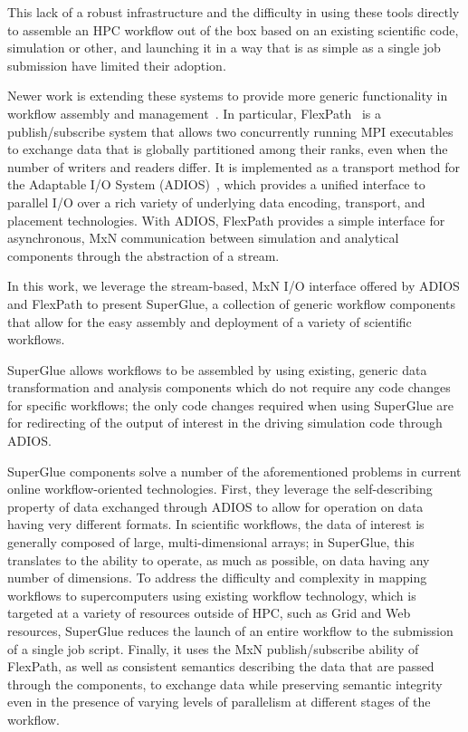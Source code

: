 
This lack of a robust infrastructure and the difficulty in
using these tools directly to assemble an
HPC workflow out of the box
based on an existing scientific code,
simulation or other,
and launching it in a way that is
as simple as a single job submission
have limited their adoption.

Newer work is extending these
systems to provide more generic functionality
in workflow assembly and
management~\cite{dayal:2014:flexpath,dayal:2015:escience,lofstead:2012:txn,lofstead:2013:txn-pdsw,lofstead:2012:txn-metadata,lofstead:2014:txn,lofstead:2016:superglue}.
In particular, FlexPath~\cite{dayal:2014:flexpath}
is a publish/subscribe system that allows
two concurrently running MPI executables to
exchange data that is globally partitioned among
their ranks, even when the number of writers and readers differ.
It is implemented as a transport method for the
Adaptable I/O System (ADIOS)~\cite{lofstead:2009:adaptable},
which provides a unified interface to parallel I/O over a rich
variety of underlying data encoding, transport, and placement technologies.
With ADIOS, FlexPath provides a simple interface for
asynchronous, MxN communication
between simulation and analytical components
through the abstraction of a stream.

In this work, we leverage the stream-based, MxN
I/O interface offered by ADIOS and FlexPath
to present SuperGlue, a collection of generic workflow components
that allow for the easy assembly and deployment
of a variety of scientific workflows.

SuperGlue allows workflows to be assembled
by using existing, generic
data transformation and 
analysis components
which do not require any code changes
for specific workflows;
the only code changes required when
using SuperGlue are 
for redirecting of the output of interest
in the driving simulation code through ADIOS.

SuperGlue components solve a number of the aforementioned problems in
current online workflow-oriented technologies.
First, they leverage the self-describing
property of data exchanged through ADIOS to
allow for operation on data having very different formats.
In scientific workflows, the data of interest
is generally composed of large, multi-dimensional
arrays; in SuperGlue, this translates to
the ability to operate, as much as possible,
on data having any number of dimensions.
To address the difficulty and complexity
in mapping workflows to supercomputers using
existing workflow technology, which is targeted
at a variety of resources outside of HPC, such as Grid and Web
resources,
SuperGlue reduces the
launch of an entire workflow to the submission of a single job script.
Finally, it uses the MxN publish/subscribe
ability of FlexPath,
as well as consistent semantics describing
the data that are passed through the components,
to exchange data while preserving semantic integrity
even in the presence of varying levels of parallelism 
at different stages of the workflow.

